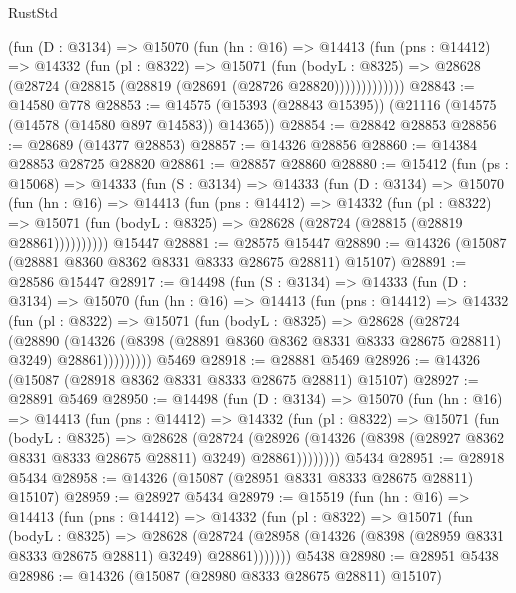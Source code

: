 \begin{lexlean}{RustStd}
\begin{coremodule}
          (fun (D : @3134) =>
          @15070
            (fun (hn : @16) =>
            @14413
              (fun (pns : @14412) =>
              @14332
                (fun (pl : @8322) =>
                @15071
                  (fun (bodyL : @8325) =>
                  @28628 (@28724 (@28815 (@28819 (@28691 (@28726 @28820)))))))))))))
@28843 := @14580 @778
@28853 := @14575 (@15393 (@28843 @15395)) (@21116 (@14575 (@14578 (@14580 @897 @14583)) @14365))
@28854 := @28842 @28853
@28856 := @28689 (@14377 @28853)
@28857 := @14326 @28856
@28860 := @14384 @28853 @28725 @28820
@28861 := @28857 @28860
@28880 := @15412
    (fun (ps : @15068) =>
    @14333
      (fun (S : @3134) =>
      @14333
        (fun (D : @3134) =>
        @15070
          (fun (hn : @16) =>
          @14413
            (fun (pns : @14412) =>
            @14332
              (fun (pl : @8322) =>
              @15071 (fun (bodyL : @8325) => @28628 (@28724 (@28815 (@28819 @28861))))))))))
    @15447
@28881 := @28575 @15447
@28890 := @14326 (@15087 (@28881 @8360 @8362 @8331 @8333 @28675 @28811) @15107)
@28891 := @28586 @15447
@28917 := @14498
    (fun (S : @3134) =>
    @14333
      (fun (D : @3134) =>
      @15070
        (fun (hn : @16) =>
        @14413
          (fun (pns : @14412) =>
          @14332
            (fun (pl : @8322) =>
            @15071
              (fun (bodyL : @8325) =>
              @28628
                (@28724
                  (@28890
                    (@14326
                      (@8398 (@28891 @8360 @8362 @8331 @8333 @28675 @28811) @3249)
                      @28861)))))))))
    @5469
@28918 := @28881 @5469
@28926 := @14326 (@15087 (@28918 @8362 @8331 @8333 @28675 @28811) @15107)
@28927 := @28891 @5469
@28950 := @14498
    (fun (D : @3134) =>
    @15070
      (fun (hn : @16) =>
      @14413
        (fun (pns : @14412) =>
        @14332
          (fun (pl : @8322) =>
          @15071
            (fun (bodyL : @8325) =>
            @28628
              (@28724
                (@28926
                  (@14326 (@8398 (@28927 @8362 @8331 @8333 @28675 @28811) @3249) @28861))))))))
    @5434
@28951 := @28918 @5434
@28958 := @14326 (@15087 (@28951 @8331 @8333 @28675 @28811) @15107)
@28959 := @28927 @5434
@28979 := @15519
    (fun (hn : @16) =>
    @14413
      (fun (pns : @14412) =>
      @14332
        (fun (pl : @8322) =>
        @15071
          (fun (bodyL : @8325) =>
          @28628
            (@28724 (@28958 (@14326 (@8398 (@28959 @8331 @8333 @28675 @28811) @3249) @28861)))))))
    @5438
@28980 := @28951 @5438
@28986 := @14326 (@15087 (@28980 @8333 @28675 @28811) @15107)

\end{coremodule}
\end{lexlean}
